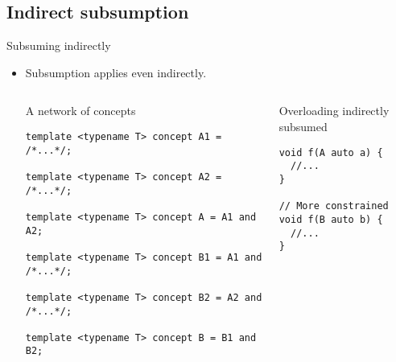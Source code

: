 \subsection{Indirect subsumption}

\begin{frame}[t,fragile]{Subsuming indirectly}
\begin{itemize}
  \item Subsumption applies even indirectly.

\begin{columns}[T]

\begin{block}{A network of concepts}
\begin{lstlisting}
template <typename T> concept A1 = /*...*/;

template <typename T> concept A2 = /*...*/;

template <typename T> concept A = A1 and A2;

template <typename T> concept B1 = A1 and /*...*/;

template <typename T> concept B2 = A2 and /*...*/;

template <typename T> concept B = B1 and B2;
\end{lstlisting}
\end{block}

\begin{block}{Overloading indirectly subsumed}
\begin{lstlisting}
void f(A auto a) {
  //...
}

// More constrained
void f(B auto b) { 
  //...
}
\end{lstlisting}
\end{block}

\end{columns}

\end{itemize}
\end{frame}
